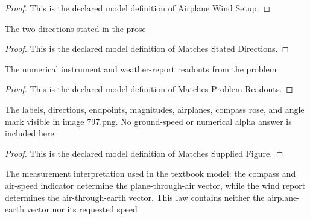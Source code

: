 \begin{proof}
  This is the declared model definition of Airplane Wind Setup.
\end{proof}
\begin{definition}
  \label{def:physics:phyx-mini-0797:phyxminiproblems-problemphyxmini0797-matchesstateddirections}
  The two directions stated in the prose
\end{definition}
\begin{proof}
  This is the declared model definition of Matches Stated Directions.
\end{proof}
\begin{definition}
  \label{def:physics:phyx-mini-0797:phyxminiproblems-problemphyxmini0797-matchesproblemreadouts}
  The numerical instrument and weather-report readouts from the problem
\end{definition}
\begin{proof}
  This is the declared model definition of Matches Problem Readouts.
\end{proof}
\begin{definition}
  \label{def:physics:phyx-mini-0797:phyxminiproblems-problemphyxmini0797-matchessuppliedfigure}
  The labels, directions, endpoints, magnitudes, airplanes, compass rose, and angle mark visible in image 797.png. No ground-speed or numerical alpha answer is included here
\end{definition}
\begin{proof}
  This is the declared model definition of Matches Supplied Figure.
\end{proof}
\begin{definition}
  \label{def:physics:phyx-mini-0797:phyxminiproblems-problemphyxmini0797-obeysdirectionalmeasurementmodel}
  The measurement interpretation used in the textbook model: the compass and air-speed indicator determine the plane-through-air vector, while the wind report determines the air-through-earth vector. This law contains neither the airplane-earth vector nor its requested speed
\end{definition}
